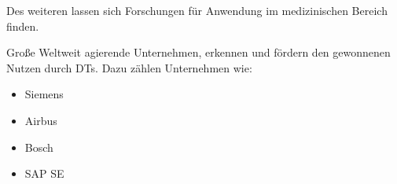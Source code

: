 Des weiteren lassen sich Forschungen für Anwendung im medizinischen Bereich finden. \autocites{barricelli2019survey}{tao2018digital}

Große Weltweit agierende Unternehmen, erkennen und fördern den gewonnenen Nutzen durch \ac{DT}s. Dazu zählen Unternehmen wie:
\begin{itemize}
    \item Siemens
    \item Airbus
    \item Bosch
    \item SAP SE
\end{itemize}

